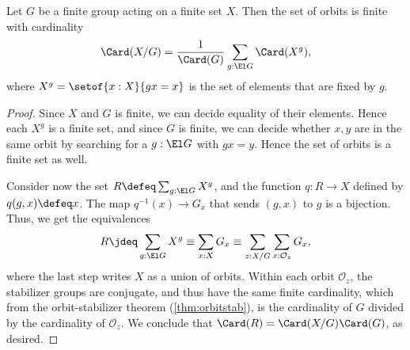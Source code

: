 \begin{lemma}
  \label{lem:burnside}
  Let $G$ be a finite group acting on a finite set $X$.
  Then the set of orbits is finite with cardinality
  \[
    \Card(X/G) = \frac1{\Card(G)}\sum_{g:\El G}\Card(X^g),
  \]
  where $X^g = \setof{x:X}{gx=x}$ is the set of elements
  that are fixed by $g$.
\end{lemma}
\begin{proof}
  Since $X$ and $G$ is finite, we can decide equality of their elements.
  Hence each $X^g$ is a finite set, and since $G$ is finite,
  we can decide whether $x,y$ are in the same orbit by searching
  for a $g : \El G$ with $gx = y$.
  Hence the set of orbits is a finite set as well.

  Consider now the set $R \defeq \sum_{g:\El G} X^g$,
  and the function $q : R \to X$
  defined by $q(g,x) \defeq x$.
  The map $q^{-1}(x) \to G_x$ that sends $(g,x)$ to $g$ is a bijection.
  Thus, we get the equivalences
  \[
    R \jdeq \sum_{g:\El G} X^g \equiv \sum_{x:X} G_x
    \equiv \sum_{z:X/G} \sum_{x : \mathcal O_z} G_x,
  \]
  where the last step writes $X$ as a union of orbits.
  Within each orbit $\mathcal O_z$,
  the stabilizer groups are conjugate,
  and thus have the same finite cardinality,
  which from the orbit-stabilizer theorem (\cref{thm:orbitstab}),
  is the cardinality of $G$ divided by the cardinality of $\mathcal O_z$.
  We conclude that $\Card(R) = \Card(X/G)\Card(G)$, as desired.
\end{proof}

